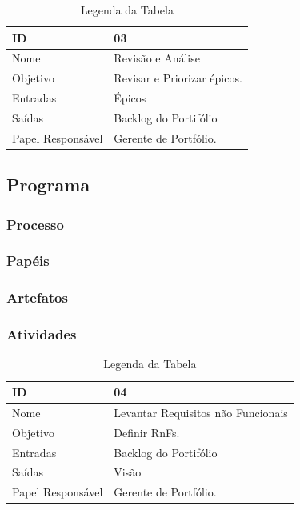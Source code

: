   \begin{table}[H]
    \centering
      \begin{tabular}{| m{5em} | m{10cm} |}
        \hline
        ID       & 03   \\ \hline
        Nome     & Revisão e Análise   \\ \hline
        Objetivo & Revisar e Priorizar épicos. \\ \hline
        Entradas & Épicos   \\ \hline
        Saídas   & Backlog do Portifólio \\ \hline
        Papel Responsável   & Gerente de Portfólio. \\ \hline
      \end{tabular}
      \caption{Legenda da Tabela}
      \label{tabela:atividade3}
  \end{table}

  \subsection{Programa}
  \subsubsection{Processo}
  \subsubsection{Papéis}
  \subsubsection{Artefatos}
  \subsubsection{Atividades}

  \begin{table}[H]
    \centering
      \begin{tabular}{| m{5em} | m{10cm} |}
        \hline
        ID       & 04   \\ \hline
        Nome     & Levantar Requisitos não Funcionais   \\ \hline
        Objetivo & Definir RnFs. \\ \hline
        Entradas & Backlog do Portifólio   \\ \hline
        Saídas   & Visão \\ \hline
        Papel Responsável   & Gerente de Portfólio. \\ \hline
      \end{tabular}
      \caption{Legenda da Tabela}
      \label{tabela:atividade4}
  \end{table}

